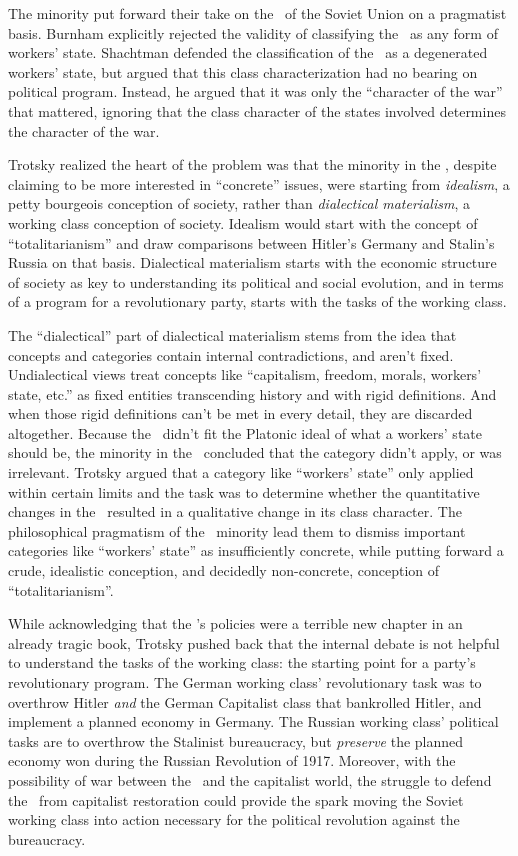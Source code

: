 The minority put forward their take on the \USSR\ of the Soviet Union on a pragmatist basis. Burnham explicitly rejected the validity of classifying the \USSR\ as any form of workers’ state. Shachtman defended the classification of the \USSR\ as a degenerated workers’ state, but argued that this class characterization had no bearing on political program. Instead, he argued that it was only the “character of the war” that mattered, ignoring that the class character of the states involved determines the character of the war.

Trotsky realized the heart of the problem was that the minority in the \SWP, despite claiming to be more interested in “concrete” issues, were starting from \emph{idealism}, a petty bourgeois conception of society, rather than \emph{dialectical materialism}, a working class conception of society. Idealism would start with the concept of “totalitarianism” and draw comparisons between Hitler’s Germany and Stalin’s Russia on that basis. Dialectical materialism starts with the economic structure of society as key to understanding its political and social evolution, and in terms of a program for a revolutionary party, starts with the tasks of the working class.

The “dialectical” part of dialectical materialism stems from the idea that concepts and categories contain internal contradictions, and aren’t fixed. Undialectical views treat concepts like “capitalism, freedom, morals, workers’ state, etc.” as fixed entities transcending history and with rigid definitions. And when those rigid definitions can’t be met in every detail, they are discarded altogether. Because the \USSR\ didn’t fit the Platonic ideal of what a workers’ state should be, the minority in the \SWP\ concluded that the category didn’t apply, or was irrelevant. Trotsky argued that a category like “workers’ state” only applied within certain limits and the task was to determine whether the quantitative changes in the \USSR\ resulted in a qualitative change in its class character. The philosophical pragmatism of the \SWP\ minority lead them to dismiss important categories like “workers’ state” as insufficiently concrete, while putting forward a crude, idealistic conception, and decidedly non-concrete, conception of “totalitarianism”.

While acknowledging that the \USSR’s policies were a terrible new chapter in an already tragic book, Trotsky pushed back that the internal debate is not helpful to understand the tasks of the working class: the starting point for a party’s revolutionary program. The German working class’ revolutionary task was to overthrow Hitler \emph{and} the German Capitalist class that bankrolled Hitler, and implement a planned economy in Germany. The Russian working class’ political tasks are to overthrow the Stalinist bureaucracy, but \emph{preserve} the planned economy won during the Russian Revolution of 1917. Moreover, with the possibility of war between the \USSR\ and the capitalist world, the struggle to defend the \USSR\ from capitalist restoration could provide the spark moving the Soviet working class into action necessary for the political revolution against the bureaucracy.

